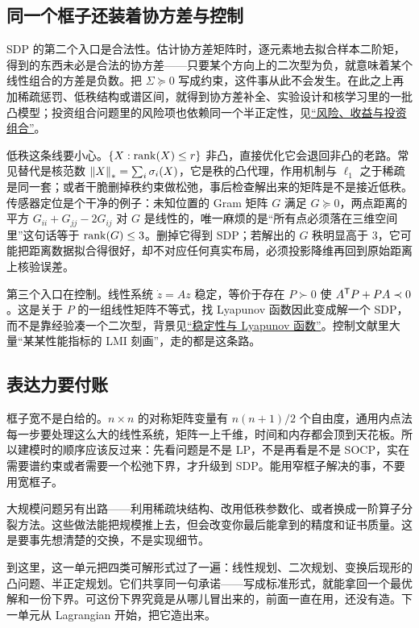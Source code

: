 \subsection{同一个框子还装着协方差与控制}

SDP 的第二个入口是合法性。估计协方差矩阵时，逐元素地去拟合样本二阶矩，得到的东西未必是合法的协方差——只要某个方向上的二次型为负，就意味着某个线性组合的方差是负数。把 \(\Sigma\succeq0\) 写成约束，这件事从此不会发生。在此之上再加稀疏惩罚、低秩结构或谱区间，就得到协方差补全、实验设计和核学习里的一批凸模型；投资组合问题里的风险项也依赖同一个半正定性，见\hyperref[sec:09-Convex-Optimization/07-Applications/04]{``风险、收益与投资组合''}。

低秩这条线要小心。\(\left\{X:\operatorname{rank}(X)\le r\right\}\) 非凸，直接优化它会退回非凸的老路。常见替代是核范数 \(\left\lVert X\right\rVert_*=\sum_i\sigma_i(X)\)，它是秩的凸代理，作用机制与 \(\ell_1\) 之于稀疏是同一套；或者干脆删掉秩约束做松弛，事后检查解出来的矩阵是不是接近低秩。传感器定位是个干净的例子：未知位置的 Gram 矩阵 \(G\) 满足 \(G\succeq0\)，两点距离的平方 \(G_{ii}+G_{jj}-2G_{ij}\) 对 \(G\) 是线性的，唯一麻烦的是``所有点必须落在三维空间里''这句话等于 \(\operatorname{rank}(G)\le3\)。删掉它得到 SDP；若解出的 \(G\) 秩明显高于 \(3\)，它可能把距离数据拟合得很好，却不对应任何真实布局，必须投影降维再回到原始距离上核验误差。

第三个入口在控制。线性系统 \(\dot z=Az\) 稳定，等价于存在 \(P\succ0\) 使 \(A^{\mathsf{T}}P+PA\prec0\)。这是关于 \(P\) 的一组线性矩阵不等式，找 Lyapunov 函数因此变成解一个 SDP，而不是靠经验凑一个二次型，背景见\hyperref[sec:15-Differential-Equations-and-Dynamical-Systems/02-Stability-and-Dynamical-Systems/02]{``稳定性与 Lyapunov 函数''}。控制文献里大量``某某性能指标的 LMI 刻画''，走的都是这条路。

\subsection{表达力要付账}

框子宽不是白给的。\(n\times n\) 的对称矩阵变量有 \(n(n+1)/2\) 个自由度，通用内点法每一步要处理这么大的线性系统，矩阵一上千维，时间和内存都会顶到天花板。所以建模时的顺序应该反过来：先看问题是不是 LP，不是再看是不是 SOCP，实在需要谱约束或者需要一个松弛下界，才升级到 SDP。能用窄框子解决的事，不要用宽框子。

大规模问题另有出路——利用稀疏块结构、改用低秩参数化、或者换成一阶算子分裂方法。这些做法能把规模推上去，但会改变你最后能拿到的精度和证书质量。这是要事先想清楚的交换，不是实现细节。

到这里，这一单元把四类可解形式过了一遍：线性规划、二次规划、变换后现形的凸问题、半正定规划。它们共享同一句承诺——写成标准形式，就能拿回一个最优解和一份下界。可这份下界究竟是从哪儿冒出来的，前面一直在用，还没有造。下一单元从 Lagrangian 开始，把它造出来。

